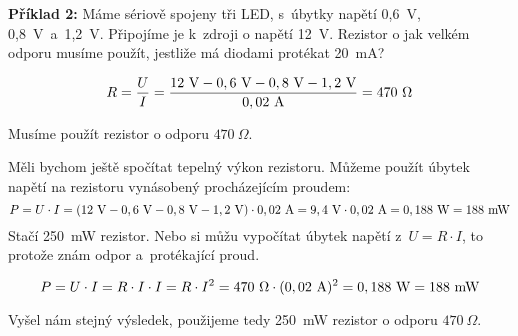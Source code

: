 {\bf Příklad 2:} Máme sériově spojeny tři LED, s~úbytky napětí 0,6~V, 0,8~V~a~1,2~V. 
Připojíme je k~zdroji o napětí 12~V. Rezistor o jak velkém odporu musíme použít, jestliže má diodami protékat 20~mA?

$$R = \frac{U}{I} = \rm \frac{12\ V-0,6\ V-0,8\ V-1,2\ V}{0,02 \ A} = 470\ \Omega$$

Musíme použít rezistor o odporu $470\ \Omega$. 

Měli bychom ještě spočítat tepelný výkon rezistoru. Můžeme použít úbytek napětí na rezistoru vynásobený procházejícím proudem:
$$P = U \cdot I = \rm (12\ V-0,6\ V-0,8\ V-1,2\ V) \cdot 0,02\ A = 9,4\ V \cdot 0,02\ A = 0,188\ W = 188\ mW$$
Stačí 250~mW rezistor. Nebo si můžu vypočítat úbytek napětí z~$U = R \cdot I$, to protože znám odpor a~protékající proud.

$$P = U \cdot I = R \cdot I \cdot I = R \cdot I^2 = 470\ \Omega \cdot \rm (0,02\ A)^2 = 0,188\ W = 188\ mW$$

Vyšel nám stejný výsledek, použijeme tedy 250~mW rezistor o odporu $470\ \Omega$.


